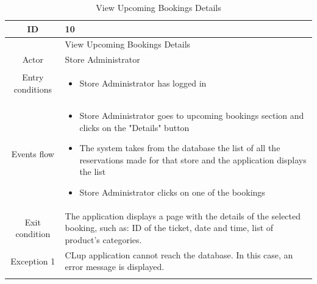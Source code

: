 \documentclass[table, 12pt]{article}
\begin{document}
\begin{longtable}{|c| p{10cm}|}
    \hline ID        & 10                                                                                                                                                \\
    \hline
                     & View Upcoming Bookings Details                                                                                                                    \\
    \hline
    Actor            & Store Administrator                                                                                                                               \\
    \hline
    Entry conditions & \begin{itemize}
        \item Store Administrator has logged in
    \end{itemize}                                                                                                                        \\
    \hline
    Events flow      & \begin{itemize}[nosep,after=\strut]
        \item Store Administrator goes to upcoming bookings section and clicks on the "Details" button
        \item The system takes from the database the list of all the reservations made for that store and the application displays the list
        \item Store Administrator clicks on one of the bookings
    \end{itemize}                                                                                                                        \\
    \hline
    Exit condition   & The application displays a page with the details of the selected booking, such as: ID of the ticket, date and time, list of product's categories.
    \\
    \hline
    \hline
    Exception 1      & CLup application cannot reach the database. In this case, an error message is displayed.                                                          \\
    \hline
    \caption{View Upcoming Bookings Details}                                                                                                                             \\
\end{longtable}
\end{document}
